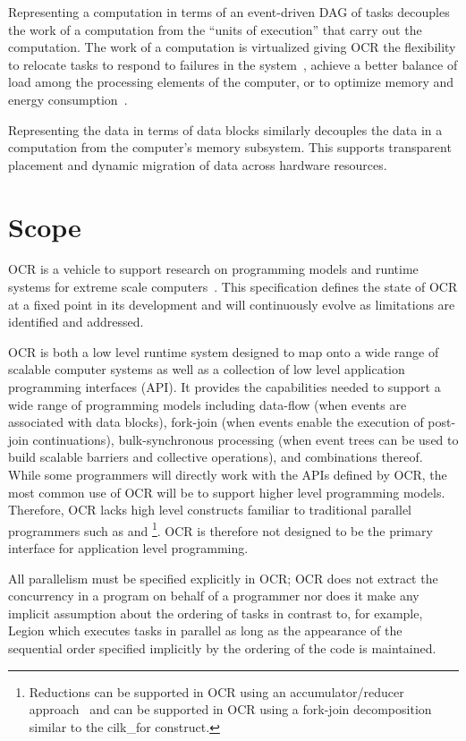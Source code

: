Representing a computation in terms of an event-driven DAG of tasks
decouples the work of a computation
from the ``units of execution'' that carry out the computation. The work
of a computation is virtualized giving OCR the flexibility to relocate tasks
to respond to failures in the system~\cite{Vrvilo14}, achieve a better balance of load
among the processing elements of the computer, or to optimize memory
and energy consumption~\cite{GZCS10,Guo10,CTBCCGYS13,SbBS14}.

Representing the data in terms of data blocks similarly
decouples the data in a computation from the computer's memory subsystem.
This supports transparent placement and dynamic migration of data
across hardware resources.
\section{Scope}
\label{sec:Scope}
OCR is a vehicle to support research on programming models and
runtime systems for extreme scale
computers~\cite{ExascaleSoftwareStudy2009,SaHS10}. This specification
defines the state of OCR at a fixed point in its development and will
continuously evolve as limitations are identified and addressed.

OCR is both a low level runtime system designed to map onto a wide range of scalable
computer systems as well as a collection of low level application programming
interfaces (API).
It provides the capabilities needed to support a wide range of programming models
including data-flow (when events are associated with data blocks),
fork-join (when events enable the execution of post-join
continuations), bulk-synchronous processing (when event trees can be
used to build scalable barriers and collective operations), and
combinations thereof. While some programmers will directly
work with the APIs defined by OCR, the most common use of OCR will be
to support higher level programming models. Therefore, OCR lacks high
level constructs familiar to traditional parallel programmers such as
 and \footnote{Reductions can be
supported in OCR using an accumulator/reducer
approach~\cite{Frigo:2009:ROC:1583991.1584017,SCZS13} and
 can be supported in OCR
using a fork-join decomposition similar to the cilk\_for construct.}.
OCR is therefore not designed to be the primary interface for application
level programming.

All parallelism must be specified explicitly in OCR; OCR does not
extract the concurrency in a program on behalf of a programmer nor does
it make any implicit assumption about the ordering of tasks in contrast to,
for example, Legion\cite{BauerLegion2012} which executes tasks in parallel
as long as the appearance of the sequential order specified implicitly by
the ordering of the code is maintained.

